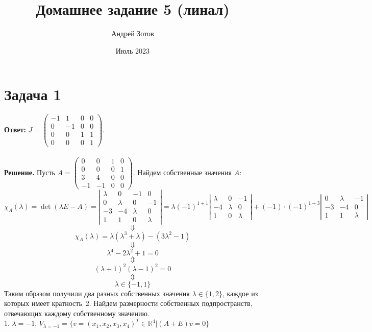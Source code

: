 \documentclass{article}
\title{Домашнее задание 5 (линал)}
\author{Андрей Зотов}
\date{Июль 2023}
\begin{document}
\maketitle

\section*{Задача 1}
{\bf Ответ:} $J=\left(\begin{array}{rrrr}-1 & 1 & 0 & 0\\0 & -1 & 0 & 0\\0 & 0 & 1 & 1\\0 & 0 & 0 & 1\end{array}\right)$.
\\
\\
{\bf Решение.} Пусть $A=\left(\begin{array}{rrrr}0 & 0 & 1 & 0\\0 & 0 & 0 & 1\\3 & 4 & 0 & 0\\-1 & -1 & 0 & 0\end{array}\right)$. Найдем собственные значения $A$:
\\
$$\chi_A(\lambda)=\det (\lambda E -A)=\left|\begin{array}{rrrr}\lambda & 0 & -1 & 0\\0 & \lambda & 0 & -1\\-3 & -4 & \lambda & 0\\1 & 1 & 0 & \lambda\end{array}\right|=\lambda (-1)^{1+1}\left|\begin{array}{rrr}\lambda & 0 & -1\\-4 & \lambda & 0\\1 & 0 & \lambda\end{array}\right|+(-1)\cdot(-1)^{1+3}\left|\begin{array}{rrr}0 & \lambda & -1\\-3 & -4 & 0\\1 & 1 & \lambda\end{array}\right|$$
$$\Downarrow$$
$$\chi_A(\lambda)=\lambda(\lambda^3+\lambda)-(3\lambda^2-1)$$
$$\Downarrow$$
$$\lambda^4-2\lambda^2+1=0$$
$$\Updownarrow$$
$$(\lambda+1)^2(\lambda-1)^2=0$$
$$\Updownarrow$$
$$\lambda \in \{-1, 1\}$$
Таким образом получили два разных собственных значения $\lambda\in\{1,2\}$, каждое из которых имеет кратность~2.
Найдем размерности собственных подпространств, отвечающих каждому собственному значению.
\\
1. $\lambda=-1$, $V_{\lambda=-1}=\{v=(x_1,x_2,x_3,x_4)^T\in\mathbb{R}^4|(A+E)v=0\}$
\end{document}
